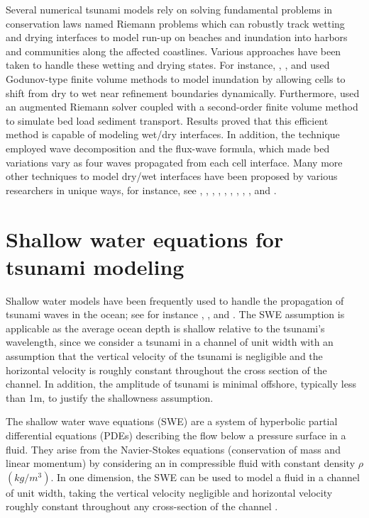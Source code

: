 \documentclass[10pt,a4paper]{article}
\begin{document}
	Several numerical tsunami models rely on solving fundamental problems in conservation laws named Riemann problems which can robustly track wetting and drying interfaces to model run-up on beaches and inundation into harbors and communities along the affected coastlines.  Various approaches have been taken to handle these wetting and drying states. For instance,   \citet{ge:2011}, \citet{li-ta-wa-ca-ba-ch-li:2021}, and \citet{fivser2016mass} used Godunov-type finite volume methods to model inundation by allowing cells to shift from dry to wet near refinement boundaries dynamically. Furthermore,   \citet{barzgaran2019numerical}  used an augmented Riemann solver coupled with a second-order finite volume method to simulate bed load sediment transport. Results proved that this efficient method is capable of modeling wet/dry interfaces.  In addition, the technique employed wave decomposition and the flux-wave formula, which made bed variations vary as four waves propagated from each cell interface. Many more other techniques to model dry/wet interfaces have been proposed by various researchers in unique ways, for instance, see   \citet{po:2015}, \citet{po:2018}, \citet{pe-bo-ma:2011}, \citet{toro2001shock}, \citet{chaabelasri1849simple}, \citet{nikolos2009unstructured}, \citet{huang2013well}, \citet{bi2014finite}, \citet{song2011unstructured}, and \citet{buttinger2019fast}.
	
	
	\section{Shallow water equations for tsunami modeling}
	\label{sec2}
	Shallow water models have been frequently used to handle the propagation of tsunami waves in the ocean; see for instance   \citet{dutykh2007water}, \citet{le-ge-be:2011}, and \citet{dias2007dynamics}. The SWE assumption is applicable as the average ocean depth is shallow relative to the tsunami's wavelength, since we consider a tsunami in a channel of unit width with an assumption that the vertical velocity of the tsunami  is negligible and the horizontal velocity is roughly constant throughout the cross section of the channel. In addition, the amplitude of tsunami is minimal offshore, typically less than 1m, to justify the shallowness assumption. 
	
	The shallow water wave equations (SWE) are a system of hyperbolic partial differential equations (PDEs) describing the flow below a pressure surface in a fluid. They arise from the Navier-Stokes equations (conservation of mass and linear momentum) by considering an in compressible fluid with constant density $\rho$ $(kg/m^{3})$.  In one dimension, the SWE  can be used to model a fluid in a channel of unit width, taking the vertical velocity negligible and horizontal velocity roughly constant throughout any cross-section of the channel \citep{ge:2008}.  
	
\end{document}
